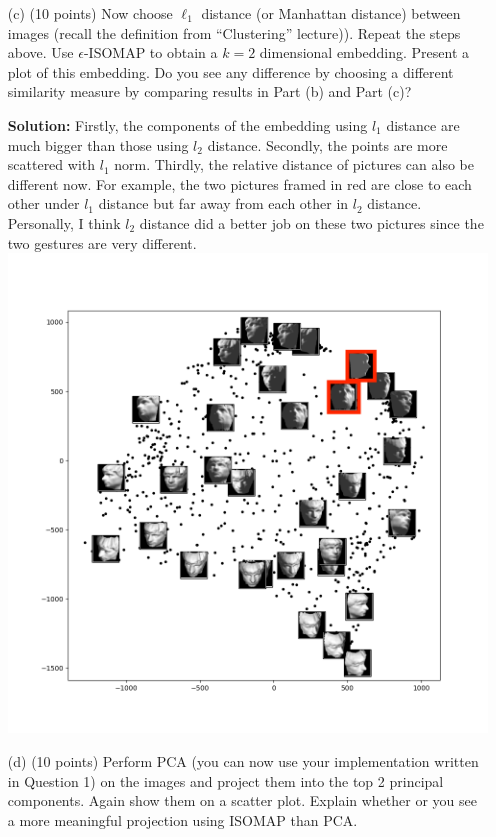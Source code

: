 \documentclass[twoside,12pt]{article}
\begin{document}
\begin{enumerate}
\item[(c)] (10 points) Now choose $\ell_1$ distance (or Manhattan distance) between images (recall the definition from ``Clustering'' lecture)). Repeat the steps above. Use $\epsilon$-ISOMAP to obtain a $k=2$ dimensional embedding. Present a plot of this embedding. Do you see any difference by choosing a different similarity measure by comparing results in Part (b) and Part (c)? 
\begin{tcolorbox}
\textbf{Solution:} Firstly, the components of the embedding using $l_1$ distance are much bigger than those using $l_2$ distance. Secondly, the points are more scattered with $l_1$ norm. Thirdly, the relative distance of pictures can also be different now. For example, the two pictures framed in red are close to each other under $l_1$ distance but far away from each other in $l_2$ distance. Personally, I think $l_2$ distance did a better job on these two pictures since the two gestures are very different.\\
\includegraphics[width=1.0\textwidth]{face_scatter_l1.png}
\end{tcolorbox}
\newpage
\item[(d)] (10 points) Perform PCA (you can now use your implementation written in Question 1) on the images and project them into the top 2 principal components. Again show them on a scatter plot. Explain whether or you see a more meaningful projection using ISOMAP than PCA. 

\end{enumerate}
\end{document}
